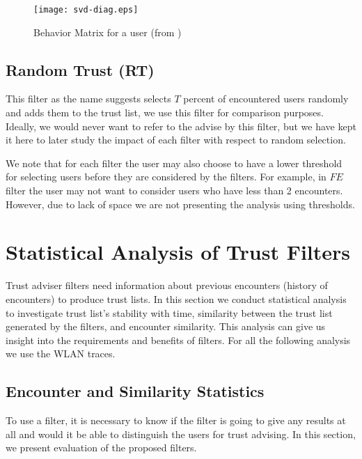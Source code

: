 \documentclass[10pt,conference]{IEEEtran}
\begin{document}
\begin{figure}
\centering
\texttt{[image: svd-diag.eps]}

\caption{Behavior Matrix  for a  user (from \cite{profilecast})}
\label{dig:svd}
\end{figure}




\subsection{Random Trust (RT)}
This filter as the name suggests selects $T$ percent of encountered users randomly and adds them to the trust list, we use this filter for comparison purposes. Ideally, we would never want to refer to the advise by this filter, but we have kept it here to later study the impact of each filter with respect to random selection.

We note that for each filter  the user may also choose to have a lower threshold for selecting users before they are considered by the filters. For example, in $FE$ filter the user may not want to consider users who have less than 2 encounters. However, due to lack of space we are not presenting the analysis using thresholds.

\section{Statistical Analysis of Trust Filters} \label{stat_ana}
Trust adviser filters need information about previous encounters (history of encounters) to  produce trust lists. In this section we conduct statistical analysis to investigate trust list's stability with time, similarity between the trust list generated by the filters, and encounter similarity.  This analysis can give us insight into the requirements and benefits of filters. For all the following analysis we use the WLAN traces.

\subsection{Encounter and Similarity Statistics}

To use a filter, it is necessary to know if the filter is going to give any results at all and would it be able to distinguish the users for trust advising.  In this section, we present evaluation of the proposed filters.
\end{document}

